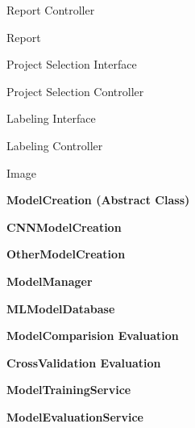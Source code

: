 \documentclass[12pt, titlepage]{article}
\newcounter{mnum}
\newcommand{\mthemnum}{M\themnum}
\begin{document}
\begin{description}
Report Controller
\item [\refstepcounter{mnum} \mthemnum \label{report}:]
Report
\item [\refstepcounter{mnum} \mthemnum \label{psi}:]
Project Selection Interface
\item [\refstepcounter{mnum} \mthemnum \label{psc}:]
Project Selection Controller
\item [\refstepcounter{mnum} \mthemnum \label{lbli}:]
Labeling Interface
\item [\refstepcounter{mnum} \mthemnum \label{lblc}:]
Labeling Controller
\item [\refstepcounter{mnum} \mthemnum \label{image}:]
Image
  \item [\refstepcounter{mnum} \mthemnum \label{modelcreation}:]
    \textbf{ModelCreation (Abstract Class)}

  \item [\refstepcounter{mnum} \mthemnum \label{cnnmodelcreation}:]
    \textbf{CNNModelCreation}

  \item [\refstepcounter{mnum} \mthemnum \label{othermodelcreation}:]
    \textbf{OtherModelCreation}

  \item [\refstepcounter{mnum} \mthemnum \label{modelmanager}:]
    \textbf{ModelManager}

  \item [\refstepcounter{mnum} \mthemnum \label{mlmodeldatabase}:]
    \textbf{MLModelDatabase}

  \item [\refstepcounter{mnum} \mthemnum \label{modelcomparison}:]
    \textbf{ModelComparision Evaluation}

  \item [\refstepcounter{mnum} \mthemnum \label{crossvalidation}:]
    \textbf{CrossValidation Evaluation}

  \item [\refstepcounter{mnum} \mthemnum \label{modeltrainingservice}:]
    \textbf{ModelTrainingService}

  \item [\refstepcounter{mnum} \mthemnum \label{modelevaluationservice}:]
    \textbf{ModelEvaluationService}
\end{description}
\end{document}

